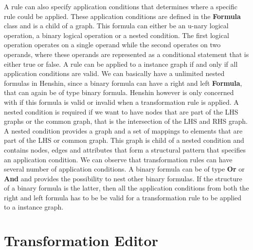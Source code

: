 A rule can also specify application conditions that determines where a specific
rule could be applied. These application conditions are defined in the
\textbf{Formula} class and is a child of a graph. This formula can either be an
u-nary logical operation, a binary logical operation or a nested condition. The
first logical operation operates on a single operand while the second operates on two
operands, where these operands are represented as a conditional statement that
is either true or false. A rule can be applied to a instance graph if and only
if all application conditions are valid. We can basically have a unlimited
nested formulas in Henshin, since a binary formula can have a right and left
\textbf{Formula}, that can again be of type binary formula. Henshin however is
only concerned with if this formula is valid or invalid when a transformation
rule is applied. A nested condition is required if we want to have nodes that
are part of the LHS graphs or the common graph, that is the intersection of the
LHS and RHS graph. A nested condition provides a graph and a set of mappings to
elements that are part of the LHS or common graph. This graph is child of
a nested condition and contains nodes, edges and attributes that form a
structural pattern that specifies an application condition. We can observe that
transformation rules can have several number of application conditions. A
binary formula can be of type \textbf{Or} or \textbf{And} and provides the
possibility to nest other binary formulas. If the structure of a binary formula
is the latter, then all the application conditions from both the right and left
formula has to be be valid for a transformation rule to be applied to a
instance graph.

\section{Transformation Editor}


